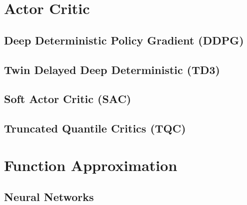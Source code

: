 \section{Actor Critic}
\subsection{Deep Deterministic Policy Gradient (DDPG)}
\subsection{Twin Delayed Deep Deterministic (TD3)}
\subsection{Soft Actor Critic (SAC)}
\subsection{Truncated Quantile Critics (TQC)}













\section{Function Approximation}

\subsection{Neural Networks}







